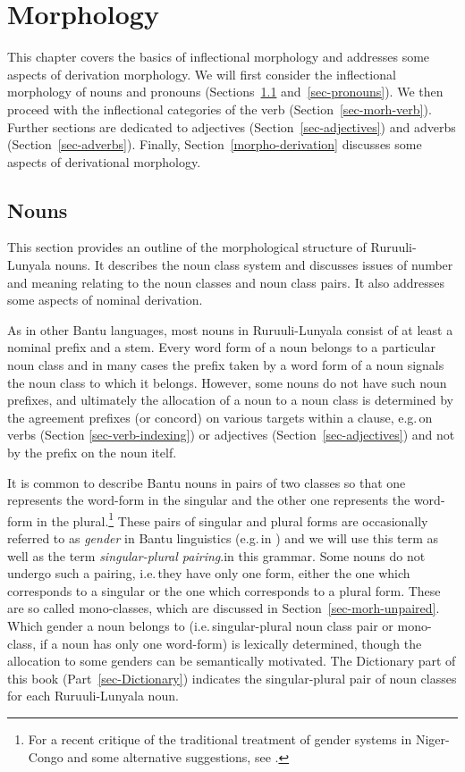 \chapter{Morphology}\label{sec-morh-nominal}
This chapter covers the basics of inflectional morphology and addresses some aspects of derivation morphology. 
We will first consider the inflectional morphology of nouns and pronouns (Sections~\ref{sec-morh-noun-class} and~\ref{sec-pronouns}). 
We then proceed with the inflectional categories of the verb (Section~\ref{sec-morh-verb}). 
Further sections are dedicated to adjectives (Section~\ref{sec-adjectives}) and adverbs (Section~\ref{sec-adverbs}). 
Finally, Section~\ref{morpho-derivation} discusses some aspects of derivational morphology.


\section{Nouns} \label{sec-morh-noun-class}

This section provides an outline of the morphological structure of Ru\-ruu\-li\hyp{}Lu\-nya\-la nouns. 
It describes the noun class system and discusses issues of number and meaning relating to the noun classes and noun class pairs. 
It also addresses some aspects of nominal derivation. 

As in other Bantu languages, most nouns in Ru\-ruu\-li\hyp{}Lu\-nya\-la consist of at least a nominal prefix and a stem. 
Every word form of a noun belongs to a particular noun class and in many cases the prefix taken by a word form of a noun signals the noun class to which it belongs. 
However, some nouns do not have such noun prefixes, and ultimately the allocation of a noun to a noun class is determined by the agreement prefixes (or concord) on various targets within a clause, e.g.\,on verbs (Section \ref{sec-verb-indexing}) or adjectives (Section~\ref{sec-adjectives}) and not by the prefix on the noun itelf.

It is common to describe Bantu nouns in pairs of two classes so that one represents the word-form in the singular and the other one represents the word-form in the plural.\footnote{For a recent critique of the traditional treatment of gender systems in Niger-Congo and some alternative suggestions, see \citet{Gldemannetal2019Niger-Congo}.}
These pairs of singular and plural forms are occasionally referred to as \textit{gender} in Bantu linguistics (e.g.\,in \citealt[103]{Katamba2003Bantu}) and we will use this term as well as the term \textit{singular-plural pairing}.in this grammar.  
Some nouns do not undergo such a pairing, i.e.\,they have only one form, either the one which corresponds to a singular or the one which corresponds to a plural form. 
These are so called mono-classes, which are discussed in Section~\ref{sec-morh-unpaired}. 
Which gender a noun belongs to (i.e.\,singular-plural noun class pair or mono-class, if a noun has only one word-form)  is lexically determined, though the allocation to some genders can be semantically motivated. 
The Dictionary part of this book (Part~\ref{sec-Dictionary}) indicates the singular-plural pair of noun classes for each Ruruuli-Lunyala noun.

